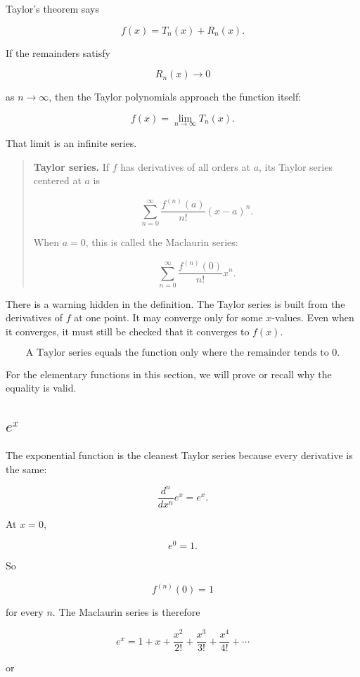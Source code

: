 Taylor's theorem says

\[
f(x)=T_n(x)+R_n(x).
\]

If the remainders satisfy

\[
R_n(x)\to0
\]

as \(n\to\infty\), then the Taylor polynomials approach the function itself:

\[
f(x)=\lim_{n\to\infty}T_n(x).
\]

That limit is an infinite series.

\begin{quote}
\textbf{Taylor series.}
If \(f\) has derivatives of all orders at \(a\), its Taylor series centered at \(a\) is

\[
\boxed{
\sum_{n=0}^{\infty}
\frac{f^{(n)}(a)}{n!}(x-a)^n.
}
\]

When \(a=0\), this is called the Maclaurin series:

\[
\boxed{
\sum_{n=0}^{\infty}
\frac{f^{(n)}(0)}{n!}x^n.
}
\]
\end{quote}

There is a warning hidden in the definition.  The Taylor series is built from the
derivatives of \(f\) at one point.  It may converge only for some \(x\)-values.  Even when
it converges, it must still be checked that it converges to \(f(x)\).

\[
\boxed{
\text{A Taylor series equals the function only where the remainder tends to \(0\).}
}
\]

For the elementary functions in this section, we will prove or recall why the equality
is valid.

\subsection{\texorpdfstring{\(e^x\)}{e^x}}
\label{subsec:taylor-series-exp}

The exponential function is the cleanest Taylor series because every derivative is the
same:

\[
\frac{d^n}{dx^n}e^x=e^x.
\]

At \(x=0\),

\[
e^0=1.
\]

So

\[
f^{(n)}(0)=1
\]

for every \(n\).  The Maclaurin series is therefore

\[
\boxed{
e^x
=
1+x+\frac{x^2}{2!}+\frac{x^3}{3!}
+\frac{x^4}{4!}+\cdots
}
\]

or

